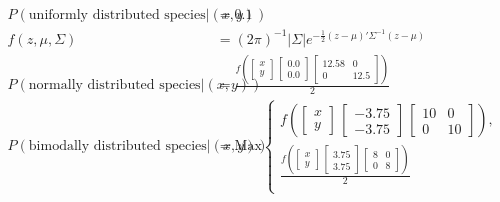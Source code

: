 \documentclass[11pt,]{article}
\begin{document}
\begin{align*}
\\
P \left( \text{uniformly distributed species} | \left( x, y \right) \right) &= 0.1 \tag*{eqn 8a} \\
%
f \left(z, \mu, \Sigma \right) &= \left(2 \pi \right) ^{-1} | \Sigma | e ^{- \frac{1}{2} \left(z - \mu \right)' \Sigma ^{-1} \left(z - \mu \right)} \tag*{eqn 8b} \\
%
P \left( \text{normally distributed species} | \left( x , y \right) \right) &= \frac{f \left( \left[ \begin{smallmatrix} x \\ y \end{smallmatrix} \right] \, \left[ \begin{smallmatrix} 0.0 \\ 0.0 \end{smallmatrix} \right] \, \left[ \begin{smallmatrix} 12.58&0 \\ 0&12.5 \end{smallmatrix} \right] \right)}{2} \tag*{eqn 8c} \\
%
P \left( \text{bimodally distributed species} | \left( x,y \right) \right) &= \text{Max} \begin{cases}
f \left(\left[ \begin{smallmatrix} x \\ y \end{smallmatrix} \right] \, \left[ \begin{smallmatrix} -3.75 \\ -3.75 \end{smallmatrix} \right] \, \left[ \begin{smallmatrix} 10&0 \\ 0&10 \end{smallmatrix} \right] \right), \\ \frac{f \left( \left[ \begin{smallmatrix} x \\ y \end{smallmatrix} \right] \, \left[ \begin{smallmatrix} 3.75 \\ 3.75 \end{smallmatrix} \right] \, \left[ \begin{smallmatrix} 8&0 \\ 0&8 \end{smallmatrix} \right] \right)} {2} \\
\end{cases} \tag*{eqn 8d} \\
%
\end{align*}
\end{document}
